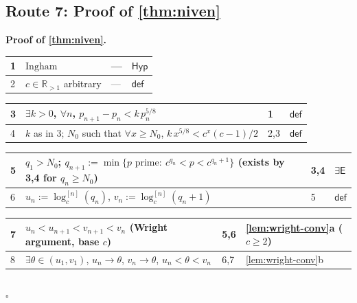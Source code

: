 \documentclass[11pt,reqno]{amsart}
\theoremstyle{blueplain}
\renewcommand{\qedsymbol}{\textcolor{proofqed}{\ensuremath{\square}}}
\renewenvironment{proof}[1][Proof]{\par\noindent\textbf{\textcolor{proofhead}{#1.}}\par\nobreak}{\par\nobreak\hfill\qedsymbol}
\numberwithin{equation}{section}
\begin{document}
\subsection{Route 7: Proof of \cref{thm:niven}}

\begin{proof}[\textbf{Proof of \cref{thm:niven}}]
\label{proof:niven}
{\scriptsize
\begin{tabular}{|m{0.7cm}|m{12cm}|m{1.4cm}|m{2.5cm}|}
\hline
1 & $\text{Ingham}$ & --- & $\mathsf{Hyp}$ \\ \hline
2 & $c\in\mathbb{R}_{>1}$ arbitrary & --- & $\mathsf{def}$ \\
\end{tabular}%
\noindent \newline
\noindent
\begin{tabular}{|m{0.7cm}|m{12cm}|m{1.4cm}|m{2.5cm}|}
\hline
3 & $\exists k>0$, $\forall n$, $p_{n+1}-p_n<k\,p_n^{5/8}$ & 1 & $\mathsf{def}$ \\ \hline
4 & $k$ as in 3; $N_0$ such that $\forall x\ge N_0$, $k\,x^{5/8}<c^{x}(c-1)/2$ & 2,3 & $\mathsf{def}$ \\
\end{tabular}%
\noindent \newline
\noindent
\begin{tabular}{|m{0.7cm}|m{12cm}|m{1.4cm}|m{2.5cm}|}
\hline
5 & $q_1>N_0$; $q_{n+1}:=\min\{p \text{ prime}:\ c^{q_n}<p<c^{q_n+1}\}$ (exists by 3,4 for $q_n\ge N_0$) & 3,4 & $\exists\mathsf{E}$ \\ \hline
6 & $u_n:=\log_c^{[n]}(q_n)$, $v_n:=\log_c^{[n]}(q_n+1)$ & 5 & $\mathsf{def}$ \\
\end{tabular}%
\noindent \newline
\noindent
\begin{tabular}{|m{0.7cm}|m{12cm}|m{1.4cm}|m{2.5cm}|}
\hline
7 & $u_n<u_{n+1}<v_{n+1}<v_n$ (Wright argument, base $c$) & 5,6 & \cref{lem:wright-conv}a ($c\ge2$) \\ \hline
8 & $\exists\theta\in(u_1,v_1)$, $u_n\to\theta$, $v_n\to\theta$, $u_n<\theta<v_n$ & 6,7 & \cref{lem:wright-conv}b \\
\end{tabular}%
\noindent \newline
\noindent
\begin{tabular}{|m{0.7cm}|m{12cm}|m{1.4cm}|m{2.5cm}|}

\end{tabular}}
\end{proof}
\end{document}
